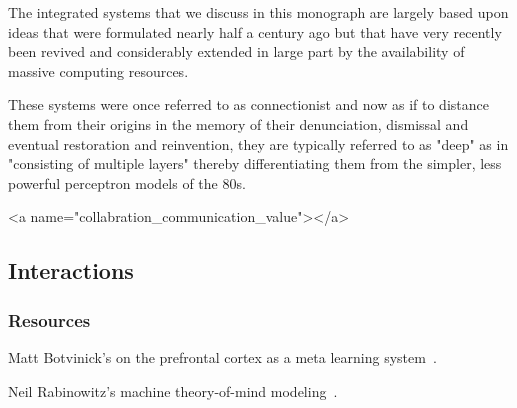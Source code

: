 The integrated systems that we discuss in this monograph are largely based upon ideas that were formulated nearly half a century ago but that have very recently been revived and considerably extended in large part by the availability of massive computing resources.

These systems were once referred to as connectionist and now as if to distance them from their origins in the memory of their denunciation, dismissal and eventual restoration and reinvention, they are typically referred to as "deep" as in "consisting of multiple layers" thereby differentiating them from the simpler, less powerful perceptron models of the 80s.



\rawhtml
<a name="collabration_communication_value"></a>
\endrawhtml
\subsection*{Interactions}


\subsubsection*{Resources}


Matt Botvinick's {} on the prefrontal cortex as a meta learning system~\cite{WangetalBIORXIV-18}.

Neil Rabinowitz's {} machine theory-of-mind modeling~\cite{RabinowitzetalCoRR-18}. 

